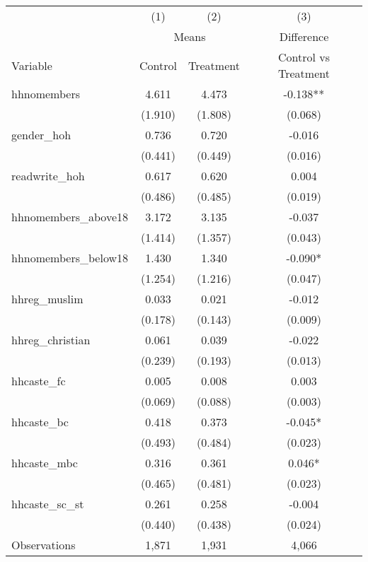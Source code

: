 \begin{tabular}{l*{3}c}
\toprule
 & (1) & (2) & (3) \\
 & \multicolumn{2}{c}{Means} & \multicolumn{1}{c}{Difference}\\ \cmidrule(lr){2-3} \cmidrule(lr){4-4}
Variable & Control & Treatment & Control vs Treatment \\
\midrule
hhnomembers&4.611&4.473&-0.138**\\
&(1.910)&(1.808)&(0.068)\\
gender\_hoh&0.736&0.720&-0.016\\
&(0.441)&(0.449)&(0.016)\\
readwrite\_hoh&0.617&0.620&0.004\\
&(0.486)&(0.485)&(0.019)\\
hhnomembers\_above18&3.172&3.135&-0.037\\
&(1.414)&(1.357)&(0.043)\\
hhnomembers\_below18&1.430&1.340&-0.090*\\
&(1.254)&(1.216)&(0.047)\\
hhreg\_muslim&0.033&0.021&-0.012\\
&(0.178)&(0.143)&(0.009)\\
hhreg\_christian&0.061&0.039&-0.022\\
&(0.239)&(0.193)&(0.013)\\
hhcaste\_fc&0.005&0.008&0.003\\
&(0.069)&(0.088)&(0.003)\\
hhcaste\_bc&0.418&0.373&-0.045*\\
&(0.493)&(0.484)&(0.023)\\
hhcaste\_mbc&0.316&0.361&0.046*\\
&(0.465)&(0.481)&(0.023)\\
hhcaste\_sc\_st&0.261&0.258&-0.004\\
&(0.440)&(0.438)&(0.024)\\
\midrule
Observations & 1,871 & 1,931 & 4,066 \\
\bottomrule
\end{tabular}
